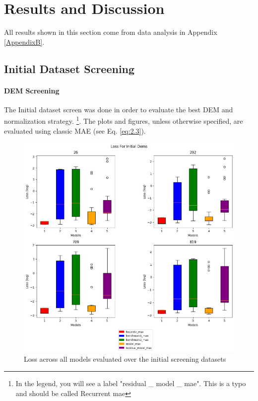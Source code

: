 
\chapter{Results and Discussion} %
\label{Chapter5} %
All results shown in this section come from data analysis in Appendix \ref{AppendixB}.

\section{Initial Dataset Screening}
\subsubsection*{DEM Screening}
The Initial dataset screen was done in order to evaluate the best DEM and normalization strategy. \footnote{In the legend, you will see a label "residual \_ model \_ mae". This is a typo and should be called Recurrent mae}. The plots and figures, unless otherwise specified, are evaluated using classic MAE (see Eq. \ref{eq:2.3}). 

\begin{figure}[htbp]
	\centering
	\includegraphics[width=0.9\linewidth, height=0.7\linewidth]{"Figures/Results/Initial screening/DEM screening plots/Box_Plot"}
	\caption[Loss over all DEMs]{Loss across all models evaluated over the initial screening datasets}
	\label{fig:dem-screening}
\end{figure}

